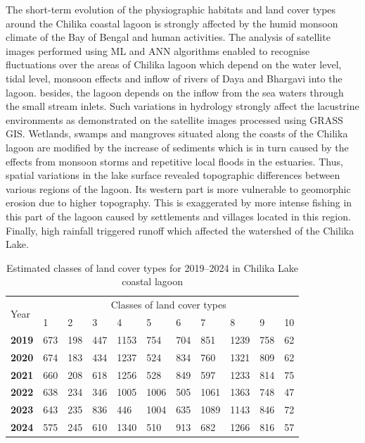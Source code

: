 \documentclass[jmse,article,submit,pdftex,moreauthors]{Definitions/mdpi}
\begin{document}
The short-term evolution of the physiographic habitats and land cover types around the Chilika coastal lagoon is strongly affected by the humid monsoon climate of the Bay of Bengal and human activities. The analysis of satellite images performed using ML and ANN algorithms enabled to recognise fluctuations over the areas of Chilika lagoon which depend on the water level, tidal level, monsoon effects and inflow of rivers of Daya and Bhargavi into the lagoon. besides, the lagoon depends on the inflow from the sea waters through the small stream inlets. Such variations in hydrology strongly affect the lacustrine environments as demonstrated on the satellite images processed using GRASS GIS. Wetlands, swamps and mangroves situated along the coasts of the Chilika lagoon are modified by the increase of sediments which is in turn caused by the effects from monsoon storms and repetitive local floods in the estuaries. Thus, spatial variations in the lake surface revealed topographic differences between various regions of the lagoon. Its western part is more vulnerable to geomorphic erosion due to higher topography. This is exaggerated by more intense fishing in this part of the lagoon caused by settlements and villages located in this region. Finally, high rainfall triggered runoff which affected the watershed of the Chilika Lake. 

\begin{table}[H]
  \centering
  \begin{tabularx}{\textwidth}{p{0.9cm}p{0.9cm}p{0.9cm}p{0.9cm}p{0.9cm}p{0.9cm}p{0.9cm}p{0.9cm}p{0.9cm}p{0.9cm}p{0.9cm}}
  \toprule
  \multirow{2}{*}{Year} & \multicolumn{10}{c}{Classes of land cover types} \\
     & 1 & 2 & 3 & 4 & 5 & 6 & 7 & 8 & 9 & 10 \\
    \midrule
    \textbf{2019} & 673 & 198 & 447 & 1153 & 754 & 704 & 851 & 1239 & 758 & 62 \\
    \textbf{2020} & 674 & 183 & 434 & 1237 & 524 & 834 & 760 & 1321 & 809 & 62 \\
    \textbf{2021} & 660 & 208 & 618 & 1256 & 528 & 849 & 597 & 1233 & 814 & 75 \\
    \textbf{2022} & 638 & 234 & 346 & 1005 & 1006 & 505 & 1061 & 1363 & 748 & 47 \\
     \textbf{2023} & 643 & 235 & 836 & 446 & 1004 & 635 & 1089 & 1143 & 846 & 72 \\
    \textbf{2024}  & 575 & 245 & 610 & 1340 & 510 & 913 & 682 & 1266 & 816 & 57 \\
\bottomrule
\end{tabularx}
  \caption{Estimated classes of land cover types for 2019--2024 in Chilika Lake coastal lagoon}
  \label{tab01}
\end{table}
\end{document}
